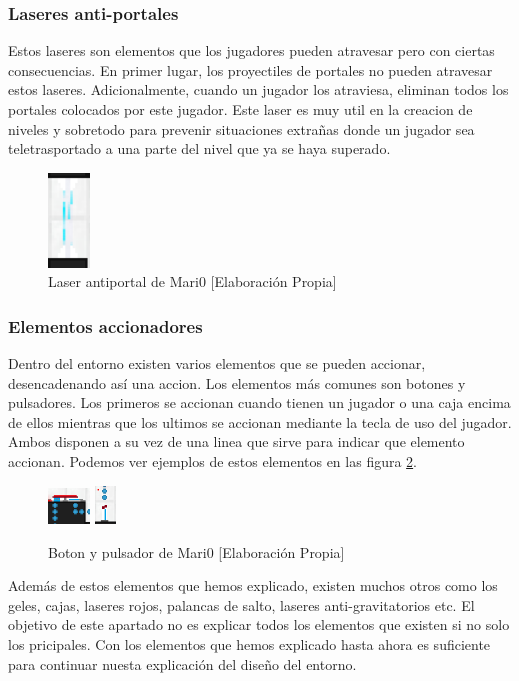 \subsubsection*{Laseres anti-portales}

Estos laseres son elementos que los jugadores pueden atravesar pero con ciertas consecuencias. En primer lugar, los proyectiles de portales no pueden atravesar estos laseres. Adicionalmente, cuando un jugador los atraviesa, eliminan todos los portales colocados por este jugador. Este laser es muy util en la creacion de niveles y sobretodo para prevenir situaciones extrañas donde un jugador sea teletrasportado a una parte del nivel que ya se haya superado.

\begin{figure}[h]
    \centering
    \includegraphics[width=0.1\textwidth]{img/laser-antiportal.png}
    \caption{Laser antiportal de Mari0 [Elaboración Propia]}
    \label{fig:antiportal}
\end{figure}

\subsubsection*{Elementos accionadores}

Dentro del entorno existen varios elementos que se pueden accionar, desencadenando así una accion. Los elementos más comunes son botones y pulsadores. Los primeros se accionan cuando tienen un jugador o una caja encima de ellos mientras que los ultimos se accionan mediante la tecla de uso del jugador. Ambos disponen a su vez de una linea que sirve para indicar que elemento accionan. Podemos ver ejemplos de estos elementos en las figura \ref {fig:boton}.

\begin{figure}[h]
    \centering
    \includegraphics[width=0.1\textwidth]{img/boton.png}
    \includegraphics[width=0.05\textwidth]{img/pulsador.png}
    \caption{Boton  y pulsador de Mari0 [Elaboración Propia]}
    \label{fig:boton}
\end{figure}

Además de estos elementos que hemos explicado, existen muchos otros como los geles, cajas, laseres rojos, palancas de salto, laseres anti-gravitatorios etc. El objetivo de este apartado no es explicar todos los elementos que existen si no solo los pricipales. Con los elementos que hemos explicado hasta ahora es suficiente para continuar nuesta explicación del diseño del entorno. 


